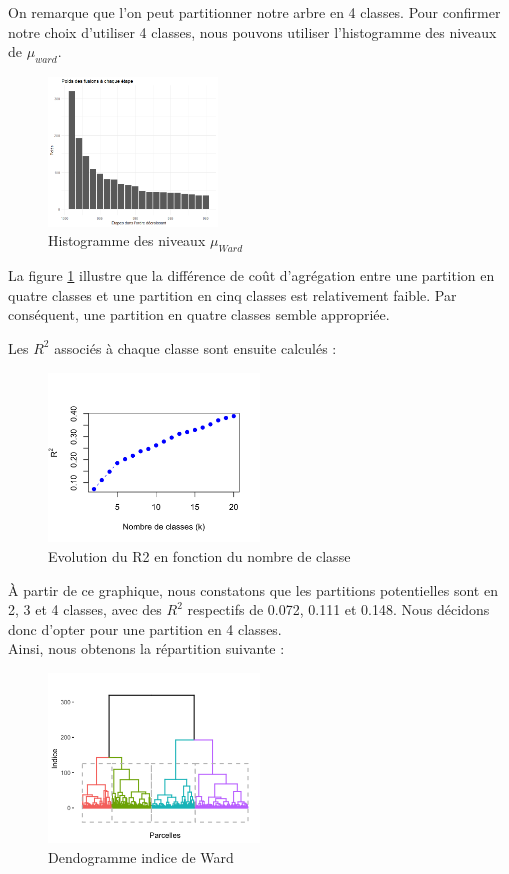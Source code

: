 \documentclass{article}
\begin{document}
On remarque que l'on peut partitionner notre arbre en 4 classes.
Pour confirmer notre choix d’utiliser 4 classes, nous pouvons utiliser l’histogramme des niveaux de $\mu_{ward}$.
\begin{figure}[H]
    \centering
    \includegraphics[width=0.4\textwidth]{histoward.png}
    \caption{Histogramme des niveaux $\mu_{Ward}$}
    \label{fig:HWard} 
\end{figure}

La figure \ref{fig:HWard} illustre que la différence de coût d'agrégation entre une partition en quatre classes et une partition en cinq classes est relativement faible. Par conséquent, une partition en quatre classes semble appropriée. 

Les \( R^2 \) associés à chaque classe sont ensuite calculés :

\begin{figure}[H]
    \centering
    \includegraphics[width=0.5\textwidth]{R222.png}
    \caption{Evolution du R2 en fonction du nombre de classe}
    \label{fig:EvolR2} 
\end{figure}
À partir de ce graphique, nous constatons que les partitions potentielles sont en 2, 3 et 4 classes, avec des \( R^2 \) respectifs de 0.072, 0.111 et 0.148. Nous décidons donc d'opter pour une partition en 4 classes.
\\
Ainsi, nous obtenons la répartition suivante :
\begin{figure}[H]
    \centering
    \includegraphics[width=0.5\textwidth]{wardcouleur.png}
    \caption{Dendogramme indice de Ward}
    \label{fig:Ward_couleur} 
\end{figure}
\end{document}
